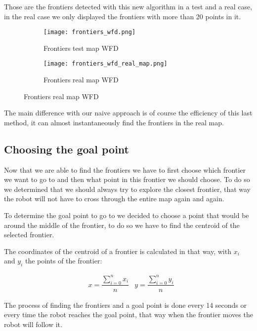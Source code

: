 Those are the frontiers detected with this new algorithm in a test and a real case, in the real case we only displayed the frontiers with more than 20 points in it.

\begin{figure}[h]
    \centering
    \begin{subfigure}{.5\textwidth}
        \centering
        \texttt{[image: frontiers\_wfd.png]}
        \caption{Frontiers test map WFD}
        \label{fig:frontiers_wfd}
    \end{subfigure}%
    \begin{subfigure}{.5\textwidth}
        \centering
        \texttt{[image: frontiers\_wfd\_real\_map.png]}
        \caption{Frontiers real map WFD}
        \label{fig:frontiers_wfd_real_map}
    \end{subfigure}
\end{figure}

The main difference with our naive approach is of course the efficiency of this last method, it can almost instantaneously find the frontiers in the real map.

\subsection{Choosing the goal point}

Now that we are able to find the frontiers we have to first choose which frontier we want to go to and then what point in this frontier we should choose.
To do so we determined that we should always try to explore the closest frontier, that way the robot will not have to cross through the entire map again and again.

To determine the goal point to go to we decided to choose a point that would be around the middle of the frontier, to do so we have to find the centroid of the selected frontier.

The coordinates of the centroid of a frontier is calculated in that way, with $x_i$ and $y_i$ the points of the frontier:

\begin{align*}
    &x = \dfrac{\sum_{i=0}^{n}x_i}{n}   &y = \dfrac{\sum_{i=0}^{n}y_i}{n}
\end{align*}

The process of finding the frontiers and a goal point is done every 14 seconds or every time the robot reaches the goal point, that way when the frontier moves the robot will follow it.

